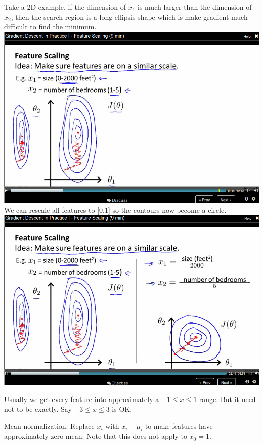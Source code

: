 \documentclass[11pt]{article}
\begin{document}
Take a 2D example,  if the dimension of \(x_1\) is much larger than the dimension of \(x_2\), then the search region is a long ellipsis shape which is make gradient much difficult to find the minimum.
\includegraphics[width=.9\linewidth]{./images/screenshot-15.png}
We can rescale all features to [0,1] so the contours now become a circle.
\includegraphics[width=.9\linewidth]{./images/screenshot-16.png}

Usually we get every feature into approximately a \(-1 \leq x \leq 1\) range. But it need not to be exactly. Say \(-3 \leq x \leq 3 \) is OK.


Mean normalization: Replace \(x_i\) with \(x_i - \mu_i\) to make features have approximately zero mean. Note that this does not apply to \(x_0 = 1\).
\end{document}
